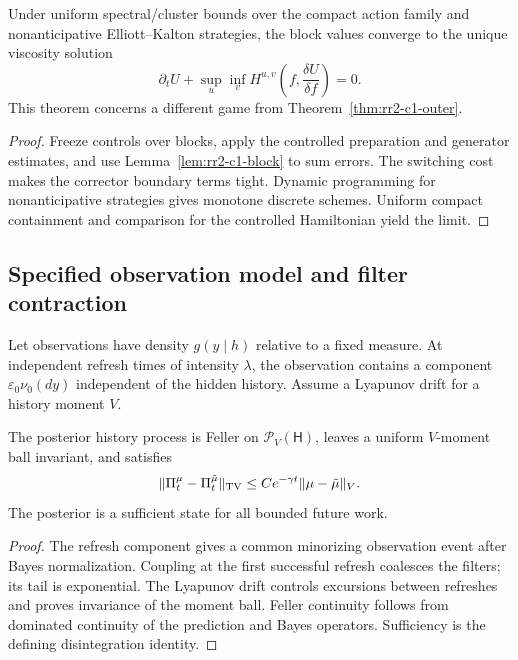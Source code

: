 \begin{theorem}
\label{thm:rr2-c1-adaptive}
Under uniform spectral/cluster bounds over the compact action family and
nonanticipative Elliott--Kalton strategies, the block values converge to the
unique viscosity solution
\[
 \partial_tU+
 \sup_u\inf_v
 H^{u,v}\!\left(f,\frac{\delta U}{\delta f}\right)=0.
\]
This theorem concerns a different game from
Theorem~\ref{thm:rr2-c1-outer}.
\end{theorem}

\begin{proof}
Freeze controls over blocks, apply the controlled preparation and generator
estimates, and use Lemma~\ref{lem:rr2-c1-block} to sum errors.  The switching
cost makes the corrector boundary terms tight.  Dynamic programming for
nonanticipative strategies gives monotone discrete schemes.  Uniform
compact containment and comparison for the controlled Hamiltonian yield the
limit.
\end{proof}

\subsection{Specified observation model and filter contraction}

Let observations have density \(g(y\mid h)\) relative to a fixed measure.
At independent refresh times of intensity \(\lambda\), the observation
contains a component \(\varepsilon_0\nu_0(dy)\) independent of the hidden
history.  Assume a Lyapunov drift for a history moment \(V\).

\begin{theorem}
\label{thm:rr2-c1-filter}
The posterior history process is Feller on
\(\mathcal P_V(\mathsf H)\), leaves a uniform \(V\)-moment ball invariant,
and satisfies
\[
 \|\Pi_t^\mu-\Pi_t^{\tilde\mu}\|_{\rm TV}
 \le Ce^{-\gamma t}\|\mu-\tilde\mu\|_V .
\]
The posterior is a sufficient state for all bounded future work.
\end{theorem}

\begin{proof}
The refresh component gives a common minorizing observation event after
Bayes normalization.  Coupling at the first successful refresh coalesces the
filters; its tail is exponential.  The Lyapunov drift controls excursions
between refreshes and proves invariance of the moment ball.  Feller
continuity follows from dominated continuity of the prediction and Bayes
operators.  Sufficiency is the defining disintegration identity.
\end{proof}

